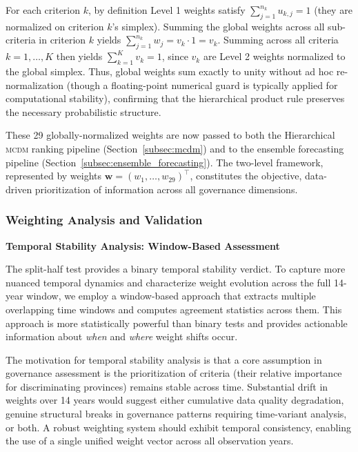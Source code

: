 \documentclass[12pt,a4paper]{article}
\newcommand{\MCDM}{\textsc{mcdm}\xspace}
\begin{document}
For each criterion $k$, by definition Level 1 weights satisfy $\sum_{j=1}^{n_k} u_{k,j} = 1$ (they are normalized on criterion $k$'s simplex). Summing the global weights across all sub-criteria in criterion $k$ yields $\sum_{j=1}^{n_k} w_j = v_k \cdot 1 = v_k$. Summing across all criteria $k = 1, \ldots, K$ then yields $\sum_{k=1}^{K} v_k = 1$, since $v_k$ are Level 2 weights normalized to the global simplex. Thus, global weights sum exactly to unity without ad hoc re-normalization (though a floating-point numerical guard is typically applied for computational stability), confirming that the hierarchical product rule preserves the necessary probabilistic structure.

These 29 globally-normalized weights are now passed to both the Hierarchical \MCDM ranking pipeline (Section~\ref{subsec:mcdm}) and to the ensemble forecasting pipeline (Section~\ref{subsec:ensemble_forecasting}). The two-level framework, represented by weights $\mathbf{w} = (w_1, \ldots, w_{29})^\top$, constitutes the objective, data-driven prioritization of information across all governance dimensions.

\subsubsection{Weighting Analysis and Validation}

\textbf{Temporal Stability Analysis: Window-Based Assessment}

The split-half test provides a binary temporal stability verdict. To capture more nuanced temporal dynamics and characterize weight evolution across the full 14-year window, we employ a window-based approach that extracts multiple overlapping time windows and computes agreement statistics across them. This approach is more statistically powerful than binary tests and provides actionable information about \textit{when} and \textit{where} weight shifts occur.

The motivation for temporal stability analysis is that a core assumption in governance assessment is the prioritization of criteria (their relative importance for discriminating provinces) remains stable across time. Substantial drift in weights over 14 years would suggest either cumulative data quality degradation, genuine structural breaks in governance patterns requiring time-variant analysis, or both. A robust weighting system should exhibit temporal consistency, enabling the use of a single unified weight vector across all observation years.
\end{document}
